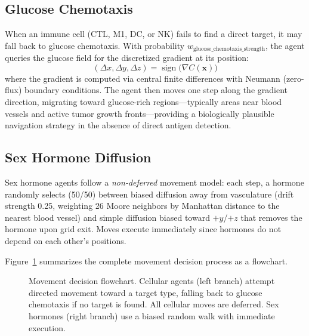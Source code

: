 \FloatBarrier
\subsection{Glucose Chemotaxis}
\label{subsec:md_chemotaxis}

When an immune cell (CTL, M1, DC, or NK) fails to find a direct target, it may fall back to glucose chemotaxis.  With probability $w_{\text{glucose\_chemotaxis\_strength}}$, the agent queries the glucose field for the discretized gradient at its position:
\begin{equation}
    (\Delta x, \Delta y, \Delta z) = \operatorname{sign}\bigl(\nabla C(\mathbf{x})\bigr)
    \label{eq:chemotaxis}
\end{equation}
where the gradient is computed via central finite differences with Neumann (zero-flux) boundary conditions.  The agent then moves one step along the gradient direction, migrating toward glucose-rich regions---typically areas near blood vessels and active tumor growth fronts---providing a biologically plausible navigation strategy in the absence of direct antigen detection.

\FloatBarrier
\subsection{Sex Hormone Diffusion}
\label{subsec:md_hormone}

Sex hormone agents follow a \emph{non-deferred} movement model: each step, a hormone randomly selects (50/50) between biased diffusion away from vasculature (drift strength 0.25, weighting 26 Moore neighbors by Manhattan distance to the nearest blood vessel) and simple diffusion biased toward $+y$/$+z$ that removes the hormone upon grid exit.  Moves execute immediately since hormones do not depend on each other's positions.

Figure~\ref{fig:movement_mechanics} summarizes the complete movement decision process as a flowchart.

\begin{figure}[htbp]
\centering
{}
\caption{Movement decision flowchart.  Cellular agents (left branch) attempt directed movement toward a target type, falling back to glucose chemotaxis if no target is found.  All cellular moves are deferred.  Sex hormones (right branch) use a biased random walk with immediate execution.}
\label{fig:movement_mechanics}
\end{figure}

